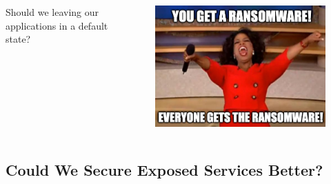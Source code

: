 \documentclass{beamer}
\begin{document}
\begin{frame}
    \begin{columns}
        \begin{column}{0.5\textwidth}
            Should we leaving our applications in a default state?
        \end{column}
        \begin{column}{0.5\textwidth}
            \begin{figure}
                \centering
                \includegraphics[width=\textwidth,keepaspectratio]{../resources/oprah.png}
            \end{figure}
        \end{column}
    \end{columns}
\end{frame}

\subsection{Could We Secure Exposed Services Better?}
\end{document}
